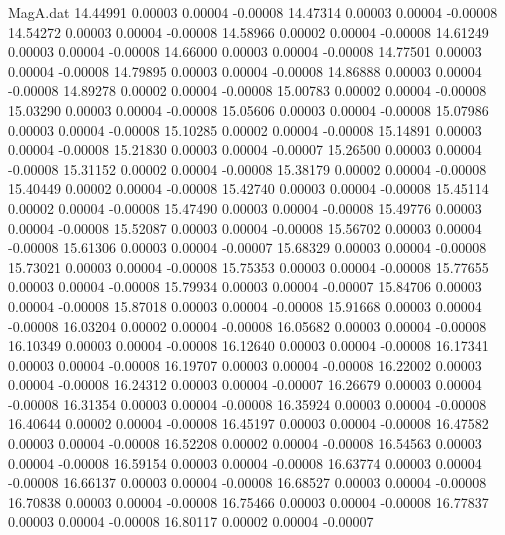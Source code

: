 \begin{filecontents}{MagA.dat}
  14.44991    0.00003    0.00004   -0.00008
  14.47314    0.00003    0.00004   -0.00008
  14.54272    0.00003    0.00004   -0.00008
  14.58966    0.00002    0.00004   -0.00008
  14.61249    0.00003    0.00004   -0.00008
  14.66000    0.00003    0.00004   -0.00008
  14.77501    0.00003    0.00004   -0.00008
  14.79895    0.00003    0.00004   -0.00008
  14.86888    0.00003    0.00004   -0.00008
  14.89278    0.00002    0.00004   -0.00008
  15.00783    0.00002    0.00004   -0.00008
  15.03290    0.00003    0.00004   -0.00008
  15.05606    0.00003    0.00004   -0.00008
  15.07986    0.00003    0.00004   -0.00008
  15.10285    0.00002    0.00004   -0.00008
  15.14891    0.00003    0.00004   -0.00008
  15.21830    0.00003    0.00004   -0.00007
  15.26500    0.00003    0.00004   -0.00008
  15.31152    0.00002    0.00004   -0.00008
  15.38179    0.00002    0.00004   -0.00008
  15.40449    0.00002    0.00004   -0.00008
  15.42740    0.00003    0.00004   -0.00008
  15.45114    0.00002    0.00004   -0.00008
  15.47490    0.00003    0.00004   -0.00008
  15.49776    0.00003    0.00004   -0.00008
  15.52087    0.00003    0.00004   -0.00008
  15.56702    0.00003    0.00004   -0.00008
  15.61306    0.00003    0.00004   -0.00007
  15.68329    0.00003    0.00004   -0.00008
  15.73021    0.00003    0.00004   -0.00008
  15.75353    0.00003    0.00004   -0.00008
  15.77655    0.00003    0.00004   -0.00008
  15.79934    0.00003    0.00004   -0.00007
  15.84706    0.00003    0.00004   -0.00008
  15.87018    0.00003    0.00004   -0.00008
  15.91668    0.00003    0.00004   -0.00008
  16.03204    0.00002    0.00004   -0.00008
  16.05682    0.00003    0.00004   -0.00008
  16.10349    0.00003    0.00004   -0.00008
  16.12640    0.00003    0.00004   -0.00008
  16.17341    0.00003    0.00004   -0.00008
  16.19707    0.00003    0.00004   -0.00008
  16.22002    0.00003    0.00004   -0.00008
  16.24312    0.00003    0.00004   -0.00007
  16.26679    0.00003    0.00004   -0.00008
  16.31354    0.00003    0.00004   -0.00008
  16.35924    0.00003    0.00004   -0.00008
  16.40644    0.00002    0.00004   -0.00008
  16.45197    0.00003    0.00004   -0.00008
  16.47582    0.00003    0.00004   -0.00008
  16.52208    0.00002    0.00004   -0.00008
  16.54563    0.00003    0.00004   -0.00008
  16.59154    0.00003    0.00004   -0.00008
  16.63774    0.00003    0.00004   -0.00008
  16.66137    0.00003    0.00004   -0.00008
  16.68527    0.00003    0.00004   -0.00008
  16.70838    0.00003    0.00004   -0.00008
  16.75466    0.00003    0.00004   -0.00008
  16.77837    0.00003    0.00004   -0.00008
  16.80117    0.00002    0.00004   -0.00007

\end{filecontents}

